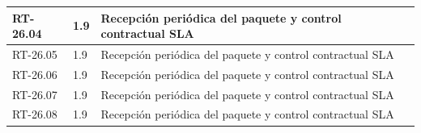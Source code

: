 \begin{longtable}{L{23mm}L{46mm}L{72mm}}
RT-26.04 & 1.9 & Recepción periódica del paquete y control contractual SLA\\\hline
RT-26.05 & 1.9 & Recepción periódica del paquete y control contractual SLA\\\hline
RT-26.06 & 1.9 & Recepción periódica del paquete y control contractual SLA\\\hline
RT-26.07 & 1.9 & Recepción periódica del paquete y control contractual SLA\\\hline
RT-26.08 & 1.9 & Recepción periódica del paquete y control contractual SLA\\\hline
\end{longtable}
